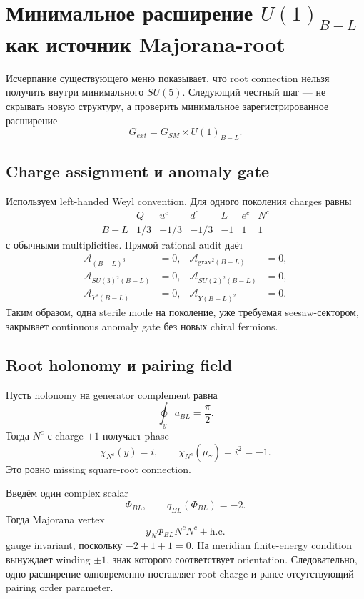 \chapter{Минимальное расширение \texorpdfstring{\(U(1)_{B-L}\)}{U(1) B-L}
как источник Majorana-root}

Исчерпание существующего меню показывает, что root connection нельзя
получить внутри минимального \(SU(5)\). Следующий честный шаг --- не скрывать
новую структуру, а проверить минимальное зарегистрированное расширение
\[
 G_{ext}=G_{SM}\times U(1)_{B-L}.
\]

\section{Charge assignment и anomaly gate}

Используем left-handed Weyl convention. Для одного поколения charges равны
\[
\begin{array}{c|rrrrrr}
 &Q&u^c&d^c&L&e^c&N^c\\
\hline
 B-L&1/3&-1/3&-1/3&-1&1&1
\end{array}
\]
с обычными multiplicities. Прямой rational audit даёт
\begin{align}
 \mathcal A_{(B-L)^3}&=0,&
 \mathcal A_{\mathrm{grav}^2(B-L)}&=0,\\
 \mathcal A_{SU(3)^2(B-L)}&=0,&
 \mathcal A_{SU(2)^2(B-L)}&=0,\\
 \mathcal A_{Y^2(B-L)}&=0,&
 \mathcal A_{Y(B-L)^2}&=0.
\end{align}
Таким образом, одна sterile mode на поколение, уже требуемая seesaw-сектором,
закрывает continuous anomaly gate без новых chiral fermions.

\section{Root holonomy и pairing field}

Пусть holonomy на generator complement равна
\begin{equation}
 \oint_y a_{BL}=\frac{\pi}{2}.
\end{equation}
Тогда \(N^c\) с charge \(+1\) получает phase
\begin{equation}
 \chi_{N^c}(y)=i,
 \qquad
 \chi_{N^c}(\mu_\gamma)=i^2=-1.
\end{equation}
Это ровно missing square-root connection.

Введём один complex scalar
\begin{equation}
 \Phi_{BL},\qquad q_{BL}(\Phi_{BL})=-2.
\end{equation}
Тогда Majorana vertex
\begin{equation}
 y_N\Phi_{BL}N^cN^c+\mathrm{h.c.}
\end{equation}
gauge invariant, поскольку \(-2+1+1=0\). На meridian finite-energy
condition вынуждает winding \(\pm1\), знак которого соответствует orientation.
Следовательно, одно расширение одновременно поставляет root charge и
ранее отсутствующий pairing order parameter.

